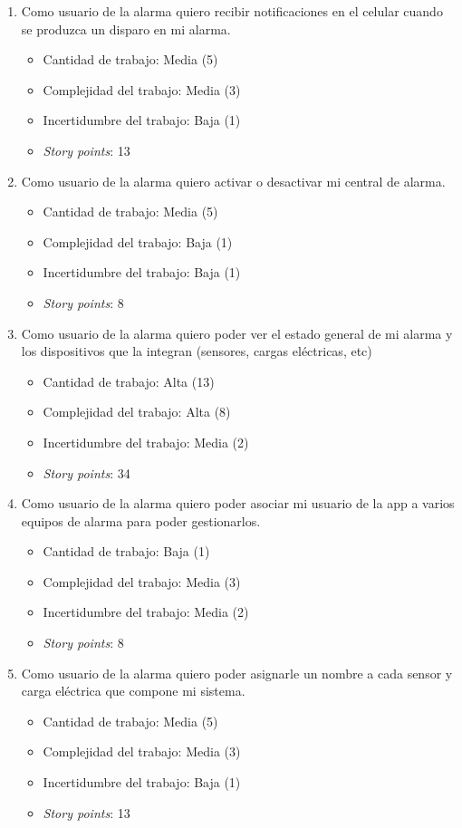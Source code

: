 \documentclass[
11pt, %
]{charter}
\begin{document}
\begin{enumerate}
	\item Como usuario de la alarma quiero recibir notificaciones en el celular cuando se produzca un disparo en mi alarma.
	\begin{itemize}
		\item Cantidad de trabajo: Media (5)
		\item Complejidad del trabajo: Media (3)
		\item Incertidumbre del trabajo: Baja (1)
		\item \textit{Story points}: 13
	\end{itemize}
	
	\item Como usuario de la alarma quiero activar o desactivar mi central de alarma.
	\begin{itemize}
		\item Cantidad de trabajo: Media (5)
		\item Complejidad del trabajo: Baja (1)
		\item Incertidumbre del trabajo: Baja (1)
		\item \textit{Story points}: 8
	\end{itemize}
	
	\item Como usuario de la alarma quiero poder ver el estado general de mi alarma y los dispositivos que la integran (sensores, cargas eléctricas, etc)
	\begin{itemize}
		\item Cantidad de trabajo: Alta (13)
		\item Complejidad del trabajo: Alta (8)
		\item Incertidumbre del trabajo: Media (2)
		\item \textit{Story points}: 34
	\end{itemize}
	
	\item Como usuario de la alarma quiero poder asociar mi usuario de la app a varios equipos de alarma para poder gestionarlos.
	\begin{itemize}
		\item Cantidad de trabajo: Baja (1)
		\item Complejidad del trabajo: Media (3)
		\item Incertidumbre del trabajo: Media (2)
		\item \textit{Story points}: 8
	\end{itemize}
	
	\item Como usuario de la alarma quiero poder asignarle un nombre a cada sensor y carga eléctrica que compone mi sistema.
	\begin{itemize}
		\item Cantidad de trabajo: Media (5)
		\item Complejidad del trabajo: Media (3)
		\item Incertidumbre del trabajo: Baja (1)
		\item \textit{Story points}: 13
	\end{itemize}
\end{enumerate}
\end{document}
